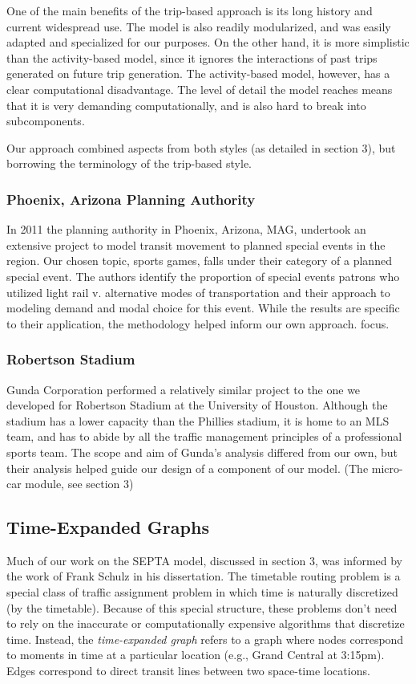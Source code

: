 One of the main benefits of the trip-based approach is its long
history and current widespread use. The model is also readily
modularized, and was easily adapted and specialized for our
purposes. On the other hand, it is more simplistic than the
activity-based model, since it ignores the interactions of past trips
generated on future trip generation. The activity-based model,
however, has a clear computational disadvantage. The level of detail
the model reaches means that it is very demanding computationally, and
is also hard to break into subcomponents.

Our approach combined aspects from both styles (as detailed in section
3), but borrowing the terminology of the trip-based style.

\subsubsection{Phoenix, Arizona Planning Authority}
In 2011 the planning authority in Phoenix, Arizona, MAG, undertook an
extensive project to model transit movement to planned special events
in the region. \cite{kuppam11} Our chosen topic, sports games, falls
under their category of a planned special event. The authors identify
the proportion of special events patrons who utilized light rail
v. alternative modes of transportation and their approach to modeling
demand and modal choice for this event. While the results are specific
to their application, the methodology helped inform our own approach.
focus.

\subsubsection{Robertson Stadium}
Gunda Corporation performed a relatively similar project to the one we
developed for Robertson Stadium at the University of
Houston.\cite{gunda} Although the stadium has a lower capacity than
the Phillies stadium, \cite{robertson-stadium} it is home to an MLS
team, and has to abide by all the traffic management principles of a
professional sports team. The scope and aim of Gunda's analysis
differed from our own, but their analysis helped guide our design of
a component of our model. (The micro-car module, see section 3)

\subsection{Time-Expanded Graphs}
Much of our work on the SEPTA model, discussed in section 3, was
informed by the work of Frank Schulz in his
dissertation\cite{schulz2005timetable}. The timetable routing problem
is a special class of traffic assignment problem in which time is
naturally discretized (by the timetable). Because of this special
structure, these problems don't need to rely on the inaccurate or
computationally expensive algorithms that discretize time. Instead,
the \emph{time-expanded graph} refers to a graph where nodes
correspond to moments in time at a particular location (e.g., Grand
Central at 3:15pm). Edges correspond to direct transit lines between
two space-time locations.


